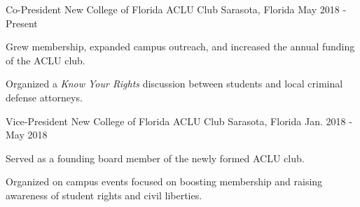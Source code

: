 

\begin{cventries}


  \cventry
    {Co-President} %
    {New College of Florida ACLU Club} %
    {Sarasota, Florida} %
    {May 2018 - Present} %
    {
      \begin{cvitems} %
        \item {Grew membership, expanded campus outreach, and increased the annual funding of the ACLU club.}
        \item {Organized a \emph{Know Your Rights} discussion between students and local criminal defense attorneys.}
      \end{cvitems}
    }

  \cventry
    {Vice-President} %
    {New College of Florida ACLU Club} %
    {Sarasota, Florida} %
    {Jan. 2018 - May 2018} %
    {
      \begin{cvitems} %
        \item {Served as a founding board member of the newly formed ACLU club.}
        \item {Organized on campus events focused on boosting membership and raising awareness of student rights and civil liberties.}
      \end{cvitems}
    }

\end{cventries}
